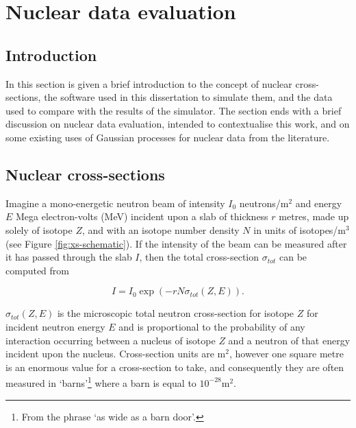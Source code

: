 \documentclass[
  12pt,
  a4paper,
  twoside]{book}
\begin{document}
\hypertarget{Background}{%
\chapter{Nuclear data evaluation}\label{Background}}

\hypertarget{introduction-1}{%
\section{Introduction}\label{introduction-1}}

In this section is given a brief introduction to the concept of nuclear cross-sections, the software used in this dissertation to simulate them, and the data used to compare with the results of the simulator. The section ends with a brief discussion on nuclear data evaluation, intended to contextualise this work, and on some existing uses of Gaussian processes for nuclear data from the literature.

\hypertarget{Background:xs}{%
\section{Nuclear cross-sections}\label{Background:xs}}

Imagine a mono-energetic neutron beam of intensity \(I_0\) neutrons/m\(^2\) and energy \(E\) Mega electron-volts (MeV) incident upon a slab of thickness \(r\) metres, made up solely of isotope \(Z\), and with an isotope number density \(N\) in units of isotopes/m\(^3\) (see Figure \ref{fig:xs-schematic}). If the intensity of the beam can be measured after it has passed through the slab \(I\), then the total cross-section \(\sigma_{tot}\) can be computed from

\begin{equation}
\label{eq:total_xs}
I = I_0 \exp\left(-rN \sigma_{tot}(Z,E)\right).
\end{equation}

\(\sigma_{tot}(Z,E)\) is the microscopic total neutron cross-section for isotope \(Z\) for incident neutron energy \(E\) and is proportional to the probability of any interaction occurring between a nucleus of isotope \(Z\) and a neutron of that energy incident upon the nucleus. Cross-section units are m\(^2\), however one square metre is an enormous value for a cross-section to take, and consequently they are often measured in `barns'\footnote{From the phrase `as wide as a barn door'.} where a barn is equal to \(10^{-28}\)m\(^2\).
\end{document}
